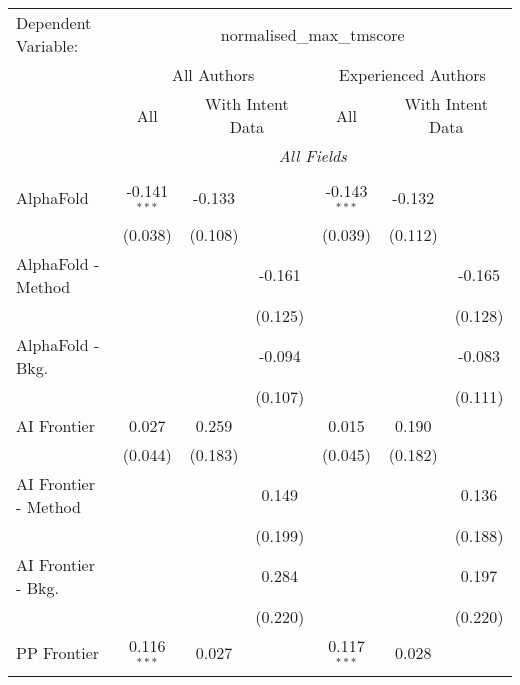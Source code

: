 \begingroup
\centering
\begin{tabular}{lcccccc}
   \tabularnewline \midrule \midrule
   Dependent Variable: & \multicolumn{6}{c}{normalised\_max\_tmscore}\\
 & \multicolumn{3}{c}{All Authors} & \multicolumn{3}{c}{Experienced Authors} \\
\cmidrule(lr){2-4} \cmidrule(lr){5-7}
 & \multicolumn{1}{c}{All} & \multicolumn{2}{c}{With Intent Data} & \multicolumn{1}{c}{All} & \multicolumn{2}{c}{With Intent Data} \\
\cmidrule(lr){2-2} \cmidrule(lr){3-4} \cmidrule(lr){5-5} \cmidrule(lr){6-7}
 & \multicolumn{6}{c}{\textit{All Fields}} \\ \\
   AlphaFold            & -0.141$^{***}$ & -0.133  &         & -0.143$^{***}$ & -0.132  &   \\   
                        & (0.038)        & (0.108) &         & (0.039)        & (0.112) &   \\   
   AlphaFold - Method   &                &         & -0.161  &                &         & -0.165\\   
                        &                &         & (0.125) &                &         & (0.128)\\   
   AlphaFold - Bkg.     &                &         & -0.094  &                &         & -0.083\\   
                        &                &         & (0.107) &                &         & (0.111)\\   
   AI Frontier          & 0.027          & 0.259   &         & 0.015          & 0.190   &   \\   
                        & (0.044)        & (0.183) &         & (0.045)        & (0.182) &   \\   
   AI Frontier - Method &                &         & 0.149   &                &         & 0.136\\   
                        &                &         & (0.199) &                &         & (0.188)\\   
   AI Frontier - Bkg.   &                &         & 0.284   &                &         & 0.197\\   
                        &                &         & (0.220) &                &         & (0.220)\\   
   PP Frontier          & 0.116$^{***}$  & 0.027   &         & 0.117$^{***}$  & 0.028   &   \\   

\end{tabular}
